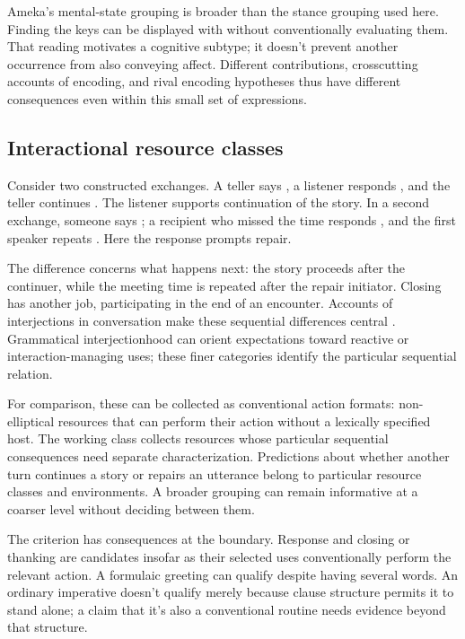 \documentclass[12pt]{article}
\begin{document}
Ameka's mental-state grouping is broader than the stance grouping used
here. Finding the keys can be displayed with  without
conventionally evaluating them. That reading motivates a cognitive subtype;
it doesn't prevent another occurrence from also conveying affect.
Different contributions, crosscutting accounts of encoding, and rival
encoding hypotheses thus have different consequences even within this
small set of expressions.

\subsection{Interactional resource classes}

Consider two constructed exchanges. A teller says , a listener responds , and the teller continues
. The listener supports continuation of the
story. In a second exchange, someone says ;
a recipient who missed the time responds , and the first
speaker repeats . Here the response prompts repair.

The difference concerns what happens next: the story proceeds after
the continuer, while the meeting time is repeated after the repair
initiator. Closing  has another job, participating in the
end of an encounter. Accounts of interjections in conversation make
these sequential differences central \citep[257--259, 263--265]{dingemanse2024}.
Grammatical interjectionhood can orient expectations toward reactive or
interaction-managing uses; these finer categories identify the particular
sequential relation.

For comparison, these can be collected as conventional action formats:
non-elliptical resources that can perform their action without a lexically
specified host. The working class collects resources whose particular sequential
consequences need separate characterization. Predictions about whether
another turn continues a story or repairs an utterance belong to
particular resource classes and environments. A broader grouping can
remain informative at a coarser level without deciding between them.

The criterion has consequences at the boundary. Response 
and closing or thanking  are candidates insofar as their
selected uses conventionally perform the relevant action. A formulaic
greeting  can qualify despite having several words.
An ordinary imperative  doesn't qualify merely because
clause structure permits it to stand alone; a claim that it's also a
conventional routine needs evidence beyond that structure.
\end{document}
